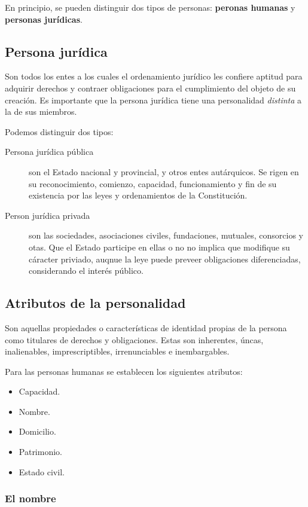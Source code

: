 \documentclass[../main.tex]{subfiles}
\begin{document}
En principio, se pueden distinguir dos tipos de personas: \textbf{peronas humanas}
y \textbf{personas jurídicas}.

\subsection{Persona jurídica}
Son todos los entes a los cuales el ordenamiento jurídico les confiere aptitud para
adquirir derechos y contraer obligaciones para el cumplimiento del objeto de su 
creación. Es importante que la persona jurídica tiene una personalidad \textit{distinta}
a la de sus miembros.

Podemos distinguir dos tipos:

\begin{description}
  \item[Persona jurídica pública] son el Estado nacional y provincial, 
      y otros entes autárquicos. Se rigen en su reconocimiento, comienzo, capacidad,
      funcionamiento y fin de su existencia por las leyes y ordenamientos de la
      Constitución.
  \item[Person jurídica privada] son las sociedades, asociaciones civiles, fundaciones,
    mutuales, consorcios y otas. Que el Estado participe en ellas o no no implica que
    modifique su cáracter priviado, auqnue la leye puede preveer obligaciones
    diferenciadas, considerando el interés público.
\end{description}

\subsection{Atributos de la personalidad}

Son aquellas propiedades o características de identidad propias de la persona 
como titulares de derechos y obligaciones. Estas son inherentes, úncas, inalienables,
imprescriptibles, irrenunciables e inembargables.

Para las personas humanas se establecen los siguientes atributos:

\begin{itemize}
  \item Capacidad.
  \item Nombre.
  \item Domicilio.
  \item Patrimonio.
  \item Estado civil.
\end{itemize}

\subsubsection{El nombre}
\end{document}
